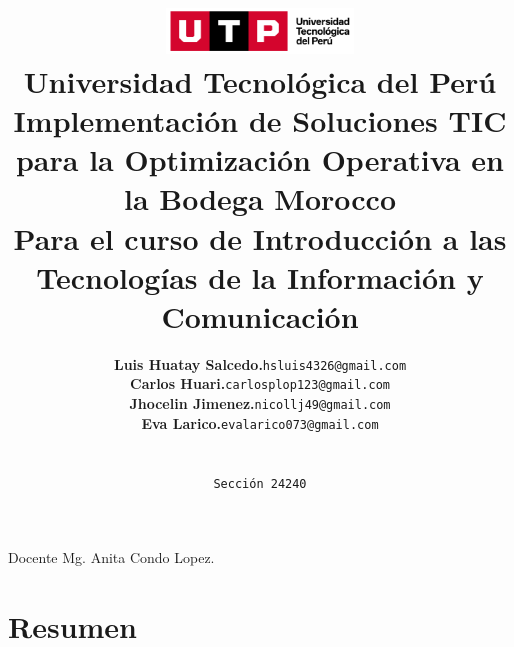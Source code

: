 \documentclass{article}
\title{
  \includegraphics[width=5cm]{./assets/logo-utp.png} \\
  \vspace{1cm}
  \textbf{Universidad Tecnológica del Perú} \\
  \vspace{2cm}
  \textbf{Implementación de Soluciones TIC para la Optimización Operativa en la Bodega Morocco} \\
  \vspace{1cm}
  \large \textbf{Para el curso de Introducción a las Tecnologías de la Información y Comunicación} \\
}
\author{
  \begin{tabular}{ll}
    \textbf{Luis Huatay Salcedo.} & \texttt{hsluis4326@gmail.com} \\
    \textbf{Carlos Huari.} & \texttt{carlosplop123@gmail.com} \\
    \textbf{Jhocelin Jimenez.} & \texttt{nicollj49@gmail.com} \\
    \textbf{Eva Larico.} & \texttt{evalarico073@gmail.com} \\
  \end{tabular} \\\\
  \texttt{Sección 24240}
}
\begin{document}
\maketitle
\begin{center}
Docente Mg. Anita Condo Lopez.
\end{center}
\restoregeometry

\newpage 

\tableofcontents


\newpage

\section{Resumen}


\end{document}
